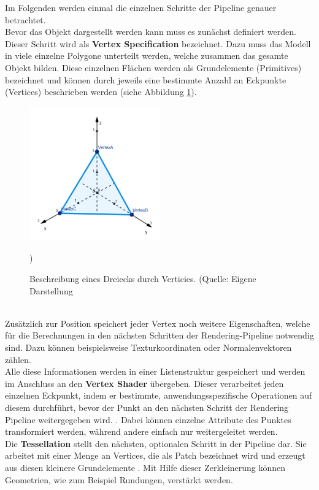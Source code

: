 Im Folgenden werden einmal die einzelnen Schritte der Pipeline genauer betrachtet.\\
Bevor das Objekt dargestellt werden kann muss es zunächst definiert werden. Dieser Schritt wird als \textbf{Vertex Specification} bezeichnet. Dazu muss das Modell in viele einzelne Polygone unterteilt werden, welche zusammen das gesamte Objekt bilden. Diese einzelnen Flächen werden als Grundelemente (Primitives) bezeichnet \citep{khronos:rendering-pipeline} und können durch jeweils eine bestimmte Anzahl an Eckpunkte (Vertices) beschrieben werden (siehe Abbildung \ref{fig:opengl-triangle}).
\begin{figure}[h!]
\centering
\includegraphics[width=0.5\textwidth]{Abbildungen/triangle.png}
\caption[OpenGL: Darstellung eines Dreiecks]{Beschreibung eines Dreiecks durch Verticies. (Quelle: Eigene Darstellung})
\label{fig:opengl-triangle}
\end{figure}\\
Zusätzlich zur Position speichert jeder Vertex noch weitere Eigenschaften, welche für die Berechnungen in den nächsten Schritten der Rendering-Pipeline notwendig sind. Dazu können beispielsweise Texturkoordinaten oder Normalenvektoren zählen. \\
Alle diese Informationen werden in einer Listenstruktur gespeichert und werden im Anschluss an den \textbf{Vertex Shader} übergeben. Dieser verarbeitet jeden einzelnen Eckpunkt, indem er bestimmte, anwendungsspezifische Operationen auf diesem durchführt, bevor der Punkt an den nächsten Schritt der Rendering Pipeline weitergegeben wird. \citep{vries:learn-opengl-triangle}. Dabei können einzelne Attribute des Punktes transformiert werden, während andere einfach nur weitergeleitet werden.\\
Die \textbf{Tessellation} stellt den nächsten, optionalen Schritt in der Pipeline dar. Sie arbeitet mit einer Menge an Vertices, die als Patch bezeichnet wird und erzeugt aus diesen kleinere Grundelemente \citep{khronos:tessellation}. Mit Hilfe dieser Zerkleinerung können Geometrien, wie zum Beispiel Rundungen, verstärkt werden.\\
